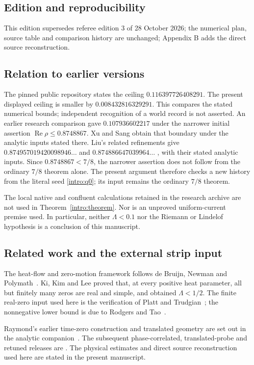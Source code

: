 \documentclass[11pt,a4paper]{article}
\theoremstyle{definition}
\theoremstyle{remark}
\newcommand{\Ree}{\operatorname{Re}}
\begin{document}
\subsection{Edition and reproducibility}
This edition supersedes referee edition 3 of 28 October 2026; the numerical plan, source table and comparison history are unchanged; Appendix B adds the direct source reconstruction.

\subsection{Relation to earlier versions}
The pinned public repository \cite{RaymondPrevious} states the ceiling
$0.116397726408291$. The present displayed ceiling is smaller by
$0.008432816329291$. This compares the stated numerical bounds; independent
recognition of a world record is not asserted.
An earlier research comparison gave $0.107936602217$ under the narrower
initial assertion $\Ree\rho\le0.8748867$. Xu and Sang
\cite[Theorem~1.1]{XuSang2026} obtain that boundary under the analytic
inputs stated there. Liu's related refinements give
$0.874957019420098946\ldots$ \cite{LiuRefinement2026} and
$0.874886647039964\ldots$ \cite[Theorem~17.1]{LiuHecke2026}, with their
stated analytic inputs. Since $0.8748867<7/8$, the narrower assertion
does not follow from the ordinary $7/8$ theorem alone. The present
argument therefore checks a new history from the literal seed
\eqref{intro:q0}; its input remains the ordinary $7/8$ theorem.

The local native and confluent calculations retained in the research
archive are not used in Theorem~\ref{intro:theorem}. Nor is an unproved
uniform-current premise used. In particular, neither $\Lambda<0.1$ nor
the Riemann or Lindelof hypothesis is a conclusion of this manuscript.


\subsection{Related work and the external strip input}
The heat-flow and zero-motion framework follows de Bruijn, Newman and
Polymath~\cite{deBruijn,Newman,Polymath}. Ki, Kim and Lee
\cite{KiKimLee2009} proved that, at every positive heat parameter,
all but finitely many zeros are real and simple, and obtained
$\Lambda<1/2$. The finite real-zero input used here is the verification
of Platt and Trudgian~\cite{PlattTrudgian}; the nonnegative lower bound
is due to Rodgers and Tao~\cite{RodgersTao}.

Raymond's earlier time-zero construction and translated geometry are
set out in the analytic companion~\cite{RaymondAnalytic}. The subsequent
phase-correlated, translated-probe and retuned releases are
\cite{RaymondPhase,RaymondCorrelated,RaymondRetuned}. The physical
estimates and direct source reconstruction used here are stated in
the present manuscript.
\end{document}
